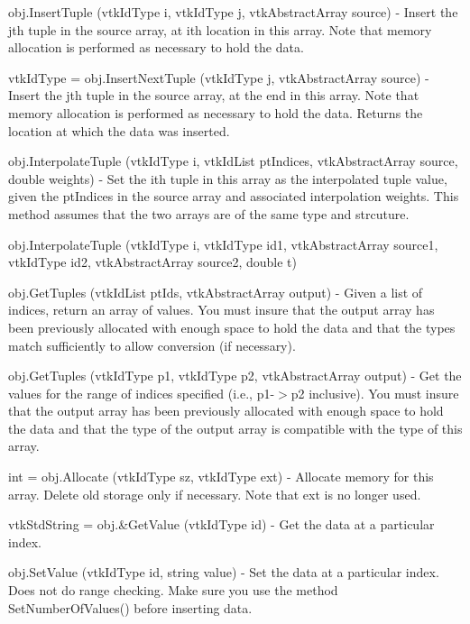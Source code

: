\begin{DoxyItemize}
\item {\ttfamily obj.\-Insert\-Tuple (vtk\-Id\-Type i, vtk\-Id\-Type j, vtk\-Abstract\-Array source)} -\/ Insert the jth tuple in the source array, at ith location in this array. Note that memory allocation is performed as necessary to hold the data.  
\item {\ttfamily vtk\-Id\-Type = obj.\-Insert\-Next\-Tuple (vtk\-Id\-Type j, vtk\-Abstract\-Array source)} -\/ Insert the jth tuple in the source array, at the end in this array. Note that memory allocation is performed as necessary to hold the data. Returns the location at which the data was inserted.  
\item {\ttfamily obj.\-Interpolate\-Tuple (vtk\-Id\-Type i, vtk\-Id\-List pt\-Indices, vtk\-Abstract\-Array source, double weights)} -\/ Set the ith tuple in this array as the interpolated tuple value, given the pt\-Indices in the source array and associated interpolation weights. This method assumes that the two arrays are of the same type and strcuture.  
\item {\ttfamily obj.\-Interpolate\-Tuple (vtk\-Id\-Type i, vtk\-Id\-Type id1, vtk\-Abstract\-Array source1, vtk\-Id\-Type id2, vtk\-Abstract\-Array source2, double t)}  
\item {\ttfamily obj.\-Get\-Tuples (vtk\-Id\-List pt\-Ids, vtk\-Abstract\-Array output)} -\/ Given a list of indices, return an array of values. You must insure that the output array has been previously allocated with enough space to hold the data and that the types match sufficiently to allow conversion (if necessary).  
\item {\ttfamily obj.\-Get\-Tuples (vtk\-Id\-Type p1, vtk\-Id\-Type p2, vtk\-Abstract\-Array output)} -\/ Get the values for the range of indices specified (i.\-e., p1-\/$>$p2 inclusive). You must insure that the output array has been previously allocated with enough space to hold the data and that the type of the output array is compatible with the type of this array.  
\item {\ttfamily int = obj.\-Allocate (vtk\-Id\-Type sz, vtk\-Id\-Type ext)} -\/ Allocate memory for this array. Delete old storage only if necessary. Note that ext is no longer used.  
\item {\ttfamily vtk\-Std\-String = obj.\&Get\-Value (vtk\-Id\-Type id)} -\/ Get the data at a particular index.  
\item {\ttfamily obj.\-Set\-Value (vtk\-Id\-Type id, string value)} -\/ Set the data at a particular index. Does not do range checking. Make sure you use the method Set\-Number\-Of\-Values() before inserting data.  

\end{DoxyItemize}
